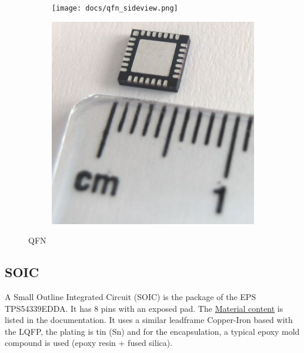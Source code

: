 \documentclass[final]{cubedoc}
\begin{document}
	\begin{figure}[h!]
		\centering
		\begin{subfigure}{.5\textwidth}
			\centering
			\texttt{[image: docs/qfn\_sideview.png]}
			\caption{}
			\label{fig:sub1}
		\end{subfigure}%
		\begin{subfigure}{.5\textwidth}
			\centering
			\includegraphics[keepaspectratio, width=0.5\linewidth, height=.3\textheight]{docs/qfn_real.jpg}
			\caption{}
			\label{fig:sub2}
		\end{subfigure}
		\caption{QFN}
		\label{fig:test}
	\end{figure}
	
	\pagebreak
	
	
	
	
	
	
	
	
	
	
	
	
	\subsection{SOIC}
	
	A Small Outline Integrated Circuit (SOIC) is the package of the EPS TPS54339EDDA. It has 8 pins with an exposed pad. The  \href{https://www.ti.com/materialcontent/en/report?pcid=271639&opn=TPS54339EDDA}{Material content} is listed in the documentation. It uses a similar leadframe Copper-Iron based with the LQFP, the plating is tin (Sn) and for the encapsulation, a typical epoxy mold compound is used (epoxy resin + fused silica). 
	
\end{document}
